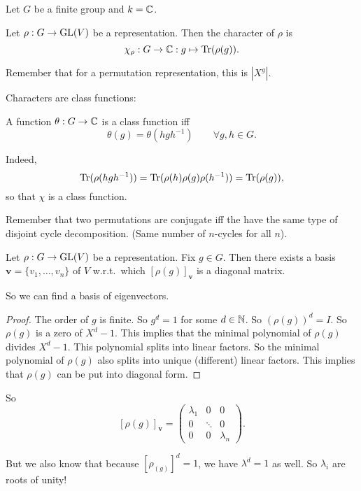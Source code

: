 Let $G$ be a finite group and $k = \mathbb{C}$.


\begin{definition}
    Let $\rho: G \to \operatorname{GL}(V)$ be a representation.
    Then the character of $\rho$ is
     \[
         \chi_\rho: G \to  \mathbb{C}: g \mapsto  \operatorname{Tr}(\rho(g))
    .\] 
\end{definition}

\begin{eg}
    Remember that for a permutation representation, this is $|X^{g}|$.
\end{eg}

Characters are class functions:

\begin{definition}
    A function $\theta: G \to  \mathbb{C}$ is a class function iff 
    \[
        \theta(g) = \theta(h g h^{-1})  \qquad \forall  g, h \in G
    .\] 
\end{definition}

Indeed,
\[
    \operatorname{Tr}(\rho(hgh^{-1})) = \operatorname{Tr}(\rho(h) \rho(g) \rho(h^{-1})) = \operatorname{Tr}(\rho(g))
,\] 
so that $\chi$ is a class function.

\begin{remark}
    Remember that two permutations are conjugate iff the have the same type of disjoint cycle decomposition. (Same number of $n$-cycles for all $n$).
\end{remark}

\begin{theorem}[3.5]
    Let $\rho: G \to \operatorname{GL}(V)$ be a representation.
    Fix $g \in G$.
    Then there exists a basis $\mathbf{v} = \{v_1, \ldots, v_n\} $ of $V$ w.r.t.\ which $[\rho(g)]_{\mathbf{v}}$ is a diagonal matrix.
\end{theorem}
So we can find a basis of eigenvectors.

\begin{proof}
    The order of $g$ is finite.
    So $g^{d} = 1$ for some $d \in \mathbb{N}$.
    So $(\rho(g))^{d} = I$. So $\rho(g)$ is a zero of  $X^{d} - 1$.
    This implies that the minimal polynomial of $\rho(g) $ divides  $X^{d} - 1$.
    This polynomial splits into linear factors.
    So the minimal polynomial of $\rho(g)$  also splits into unique (different) linear factors.
    This implies that $\rho(g)$ can be put into diagonal form.
\end{proof}

So 
\[
    [\rho(g)]_{\mathbf{v}} = \begin{pmatrix}
        \lambda_1 & 0 & 0\\
        0 & \ddots & 0\\
        0 & 0 & \lambda_n
    \end{pmatrix}
.\] 

But we also know that because $[\rho_(g)]^{d} = 1$, we have $\lambda^{d} = 1$ as well.  So $\lambda_i$ are roots of unity!

